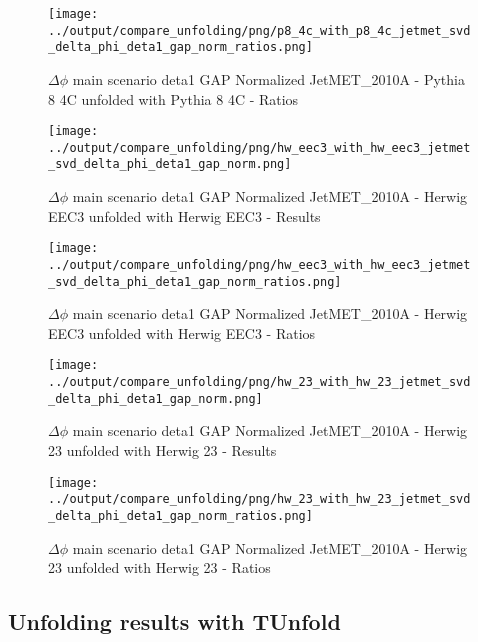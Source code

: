 \documentclass[11pt]{book}
\begin{document}
\begin{figure}[ht]
\centering
\texttt{[image: ../output/compare\_unfolding/png/p8\_4c\_with\_p8\_4c\_jetmet\_svd\_delta\_phi\_deta1\_gap\_norm\_ratios.png]}
\caption{$\Delta\phi$ main scenario deta1 GAP Normalized JetMET\_2010A - Pythia 8 4C unfolded with Pythia 8 4C - Ratios}
\label{p8_p8_jetmet_svd_delta_phi_deta1_gap_norm_b}
\end{figure}

\begin{figure}[ht]
\centering
\texttt{[image: ../output/compare\_unfolding/png/hw\_eec3\_with\_hw\_eec3\_jetmet\_svd\_delta\_phi\_deta1\_gap\_norm.png]}
\caption{$\Delta\phi$ main scenario deta1 GAP Normalized JetMET\_2010A - Herwig EEC3 unfolded with Herwig EEC3 - Results}
\label{hw_eec3_hw_eec3_jetmet_svd_delta_phi_deta1_gap_norm_a}
\end{figure}

\begin{figure}[ht]
\centering
\texttt{[image: ../output/compare\_unfolding/png/hw\_eec3\_with\_hw\_eec3\_jetmet\_svd\_delta\_phi\_deta1\_gap\_norm\_ratios.png]}
\caption{$\Delta\phi$ main scenario deta1 GAP Normalized JetMET\_2010A - Herwig EEC3 unfolded with Herwig EEC3 - Ratios}
\label{hw_eec3_hw_eec3_jetmet_svd_delta_phi_deta1_gap_norm_b}
\end{figure}

\begin{figure}[ht]
\centering
\texttt{[image: ../output/compare\_unfolding/png/hw\_23\_with\_hw\_23\_jetmet\_svd\_delta\_phi\_deta1\_gap\_norm.png]}
\caption{$\Delta\phi$ main scenario deta1 GAP Normalized JetMET\_2010A - Herwig 23 unfolded with Herwig 23 - Results}
\label{hw_23_hw_23_jetmet_svd_delta_phi_deta1_gap_norm_a}
\end{figure}

\begin{figure}[ht]
\centering
\texttt{[image: ../output/compare\_unfolding/png/hw\_23\_with\_hw\_23\_jetmet\_svd\_delta\_phi\_deta1\_gap\_norm\_ratios.png]}
\caption{$\Delta\phi$ main scenario deta1 GAP Normalized JetMET\_2010A - Herwig 23 unfolded with Herwig 23 - Ratios}
\label{hw_23_hw_23_jetmet_svd_delta_phi_deta1_gap_norm_b}
\end{figure}


\clearpage
\subsection{Unfolding results with TUnfold}
\end{document}
